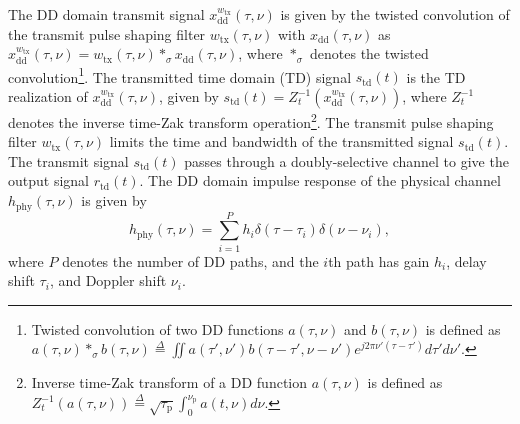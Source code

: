 The DD domain transmit signal $x_{\mathrm{dd}}^{w_{\mathrm{tx}}}(\tau,\nu)$ is given by the twisted convolution of the transmit pulse shaping filter $w_{\mathrm{tx}}(\tau,\nu)$ with $x_{\mathrm{dd}}(\tau,\nu)$ as $x_{\mathrm{dd}}^{w_{\mathrm{tx}}}(\tau,\nu) = w_{\mathrm{tx}}(\tau,\nu)*_{\sigma}x_{\mathrm{dd}}(\tau,\nu)$,
where $*_{\sigma}$ denotes the twisted convolution\footnote{Twisted convolution of two DD functions $a(\tau,\nu)$ and $b(\tau,\nu)$ is defined as 
$a(\tau,\nu) \ast_\sigma b(\tau,\nu) \overset{\Delta}{=} \iint a(\tau', \nu') b(\tau-\tau',\nu-\nu')e^{j2\pi\nu'(\tau-\tau')}d\tau'  d\nu'$.}. The transmitted time domain (TD) signal $s_{\mathrm{td}}(t)$ is the TD realization of $x_{\mathrm{dd}}^{w_{\mathrm{tx}}}(\tau,\nu)$, given by
$s_{\mathrm{td}}(t)=Z_{t}^{-1}\left(x_{\mathrm{dd}}^{w_{\mathrm{tx}}}(\tau,\nu)\right)$, where $Z_{t}^{-1}$ denotes the inverse time-Zak transform operation\footnote{Inverse time-Zak transform of a DD function $a(\tau,\nu)$ is defined as $Z_{t}^{-1}(a(\tau,\nu)) \overset{\Delta}{=} \sqrt{\tau_{\mathrm p}} \int_0^{\nu_{\mathrm p}} a(t,\nu) d\nu$.}. The transmit pulse shaping filter $w_{\mathrm{tx}}(\tau,\nu)$ 
limits the time and bandwidth of the transmitted signal $s_{\mathrm{td}}(t)$. The transmit signal $s_{\mathrm{td}}(t)$ passes through a doubly-selective channel to give the output signal $r_{\mathrm{td}}(t)$. The DD domain impulse response of the physical channel $h_{\mathrm{phy}}(\tau,\nu)$ is given by
\begin{equation}
h_{\mathrm{phy}}(\tau,\nu)=\sum_{i=1}^{P}h_{i}\delta(\tau-\tau_{i})\delta(\nu-\nu_{i}),
\end{equation}
where $P$ denotes the number of DD paths, and the $i$th path has gain $h_{i}$, delay shift $\tau_{i}$, and Doppler shift $\nu_{i}$. 

